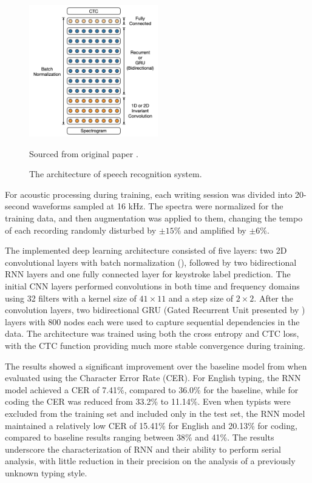 \documentclass[a4paper,11pt,twoside]{report}
\theoremstyle{definition}
\begin{document}
\begin{figure}[h!]
    \centering
    \includegraphics[width=0.5\textwidth]{img_related_work/speech2019arch.png}
    \caption{The architecture of speech recognition system.}
    \footnotesize{Sourced from original paper \cite{speech2016}.}
    \label{fig:speech2016arch}
\end{figure}

For acoustic processing during training, each writing session was divided into 20-second waveforms sampled at 16 kHz. The spectra were normalized for the training data, and then augmentation was applied to them, changing the tempo of each recording randomly disturbed by $\pm15\%$ and amplified by $\pm6\%$.

The implemented deep learning architecture consisted of five layers: two 2D convolutional layers with batch normalization (\textit{\cite{batchnorm}}), followed by two bidirectional RNN layers and one fully connected layer for keystroke label prediction. The initial CNN layers performed convolutions in both time and frequency domains using 32 filters with a kernel size of $41\times11$ and a step size of $2\times2$. After the convolution layers, two bidirectional GRU (Gated Recurrent Unit presented by \textit{\cite{gru}}) layers with 800 nodes each were used to capture sequential dependencies in the data. The architecture was trained using both the cross entropy and CTC loss, with the CTC function providing much more stable convergence during training.

The results showed a significant improvement over the baseline model from \textit{\cite{skypetype}} when evaluated using the Character Error Rate (CER). For English typing, the RNN model achieved a CER of 7.41\%, compared to 36.0\% for the baseline, while for coding the CER was reduced from 33.2\% to 11.14\%. Even when typists were excluded from the training set and included only in the test set, the RNN model maintained a relatively low CER of 15.41\% for English and 20.13\% for coding, compared to baseline results ranging between 38\% and 41\%. The results underscore the characterization of RNN and their ability to perform serial analysis, with little reduction in their precision on the analysis of a previously unknown typing style.\\
\end{document}
